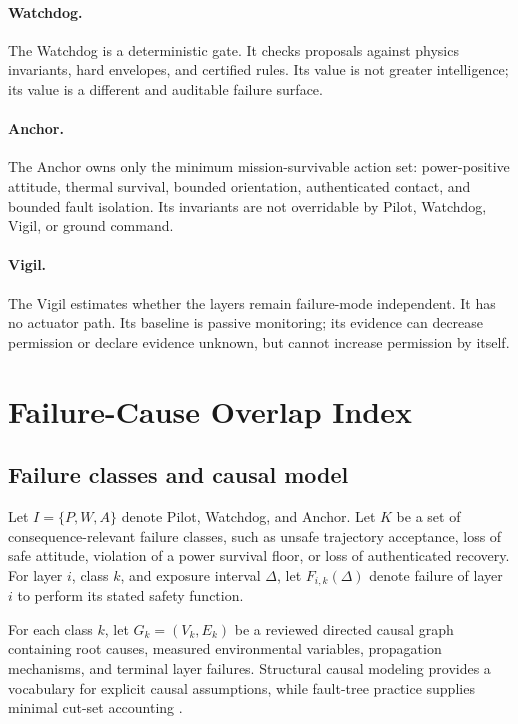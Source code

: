 \paragraph{Watchdog.} The Watchdog is a deterministic gate. It checks proposals against physics invariants, hard envelopes, and certified rules. Its value is not greater intelligence; its value is a different and auditable failure surface.

\paragraph{Anchor.} The Anchor owns only the minimum mission-survivable action set: power-positive attitude, thermal survival, bounded orientation, authenticated contact, and bounded fault isolation. Its invariants are not overridable by Pilot, Watchdog, Vigil, or ground command.

\paragraph{Vigil.} The Vigil estimates whether the layers remain failure-mode independent. It has no actuator path. Its baseline is passive monitoring; its evidence can decrease permission or declare evidence unknown, but cannot increase permission by itself.

\section{Failure-Cause Overlap Index}
\subsection{Failure classes and causal model}
Let $I=\{P,W,A\}$ denote Pilot, Watchdog, and Anchor. Let $K$ be a set of consequence-relevant failure classes, such as unsafe trajectory acceptance, loss of safe attitude, violation of a power survival floor, or loss of authenticated recovery. For layer $i$, class $k$, and exposure interval $\Delta$, let $F_{i,k}(\Delta)$ denote failure of layer $i$ to perform its stated safety function.

For each class $k$, let $G_k=(V_k,E_k)$ be a reviewed directed causal graph containing root causes, measured environmental variables, propagation mechanisms, and terminal layer failures. Structural causal modeling provides a vocabulary for explicit causal assumptions, while fault-tree practice supplies minimal cut-set accounting \cite{Pearl2009,Vesely1981}.

